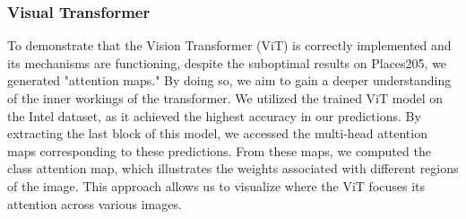 \documentclass[twocolumn,superscriptaddress,aps]{revtex4-1}
\begin{document}
\subsubsection{Visual Transformer}

To demonstrate that the Vision Transformer (ViT) is correctly implemented and its mechanisms are functioning, despite the suboptimal results on Places205, we generated "attention maps." By doing so, we aim to gain a deeper understanding of the inner workings of the transformer. We utilized the trained ViT model on the Intel dataset, as it achieved the highest accuracy in our predictions. By extracting the last block of this model, we accessed the multi-head attention maps corresponding to these predictions. From these maps, we computed the class attention map, which illustrates the weights associated with different regions of the image. This approach allows us to visualize where the ViT focuses its attention across various images.
\end{document}
